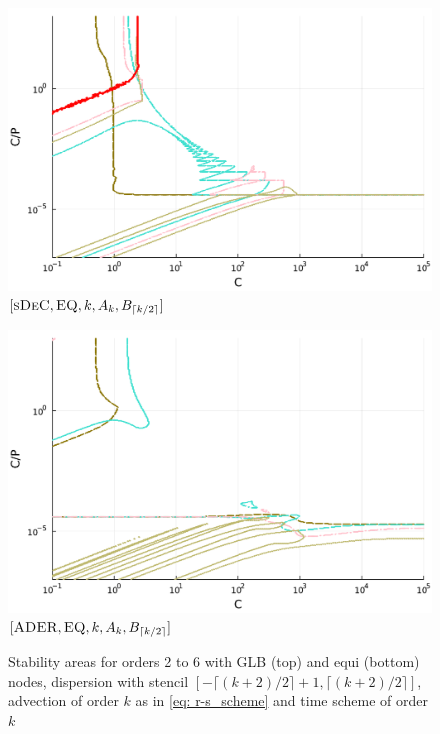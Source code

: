\begin{figure}
\begin{minipage}[t]{0.32\textwidth}
		\centering
		\includegraphics[width=\textwidth]{pdf/pdepics/disp/IMEXDeC_subtimesteps_equispaced_disp_all_2-6_newE.pdf}
		\small$[\textsc{sDeC}, \textsc{EQ},k, A_k,B_{\lceil k/2 \rceil}]$\par
	\end{minipage}
	\begin{minipage}[t]{0.32\textwidth}
		\centering
		\includegraphics[width=\textwidth]{pdf/pdepics/disp/IMEXADER_equispaced_disp_all_2-6_newE.pdf}
		\small$[\textsc{ADER}, \textsc{EQ},k, A_k,B_{\lceil k/2 \rceil}]$\par
	\end{minipage}
	\caption{Stability areas for orders 2 to 6 with GLB (top) and equi (bottom) nodes, dispersion with stencil $[-\lceil (k+2)/2 \rceil +1 ,\lceil (k+2)/2\rceil]$, advection of order $k$ as in \eqref{eq: r-s_scheme} and time scheme of order $k$}
	\label{fig: disp_allall}
\end{figure}

